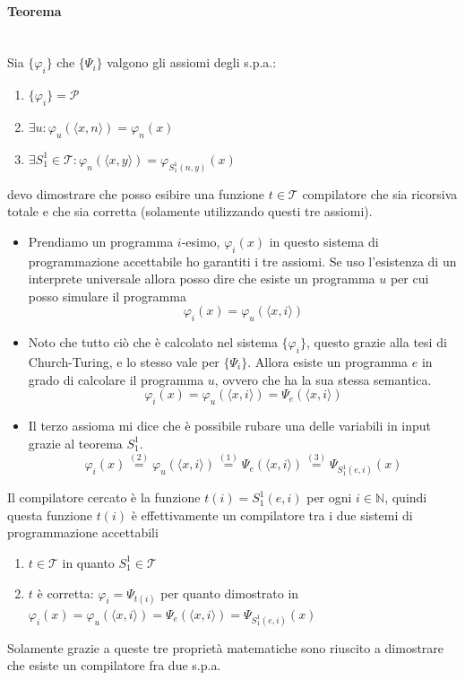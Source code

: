 \documentclass{article}
\begin{document}
\paragraph{Teorema}\mbox{}\\
Sia $\{\varphi_i\}$ che $\{\Psi_i\}$ valgono gli assiomi degli s.p.a.:
\begin{enumerate}
    \item $\{\varphi_i\}=\mathcal{P}$
    \item $\exists u:\varphi_u\left(\langle x,n\rangle\right)=\varphi_n(x)$
    \item $\exists S_1^1\in\mathcal{T}:\varphi_n\left(\langle x,y\rangle\right)=\varphi_{S_1^1(n,y)}(x)$
\end{enumerate}
devo dimostrare che posso esibire una funzione $t\in\mathcal{T}$ compilatore
che sia ricorsiva totale e che sia corretta (solamente utilizzando questi tre assiomi).
\begin{itemize}
    \item Prendiamo un programma $i$-esimo, $\varphi_i(x)$ in questo sistema di programmazione
          accettabile ho garantiti i tre assiomi. Se uso l'esistenza di un interprete universale allora
          posso dire che esiste un programma $u$ per cui posso simulare il programma
          $$\varphi_i(x)=\varphi_u\left(\langle x,i\rangle\right)$$
    \item Noto che tutto ciò che è calcolato nel sistema $\{\varphi_i\}$, questo grazie
          alla tesi di Church-Turing, e lo stesso vale per $\{\Psi_i\}$. Allora esiste un programma $e$
          in grado di calcolare il programma $u$, ovvero che ha la sua stessa semantica.
          $$\varphi_i(x)=\varphi_u\left(\langle x,i\rangle\right)=\Psi_e\left(\langle x,i\rangle\right)$$
    \item Il terzo assioma mi dice che è possibile rubare una delle variabili in input grazie al
          teorema $S_1^1$.
          $$\varphi_i(x)\overset{(2)}{=}\varphi_u\left(\langle x,i\rangle\right)\overset{(1)}{=}\Psi_e\left(\langle x,i\rangle\right)\overset{(3)}{=}\Psi_{S_1^1(e,i)}(x)$$
\end{itemize}
Il compilatore cercato è la funzione $t(i)=S_1^1(e,i)$ per ogni $i\in\mathbb{N}$, quindi
questa funzione $t(i)$ è effettivamente un compilatore tra i due sistemi di programmazione
accettabili
\begin{enumerate}
    \item $t\in\mathcal{T}$ in quanto $S_1^1\in\mathcal{T}$
    \item $t$ è corretta: $\varphi_i=\Psi_{t(i)}$ per quanto dimostrato in
          $\varphi_i(x)=\varphi_u\left(\langle x,i\rangle\right)=\Psi_e\left(\langle x,i\rangle\right)=\Psi_{S_1^1(e,i)}(x)$
\end{enumerate}
Solamente grazie a queste tre proprietà matematiche sono riuscito a dimostrare che esiste un compilatore
fra due s.p.a.
\end{document}

